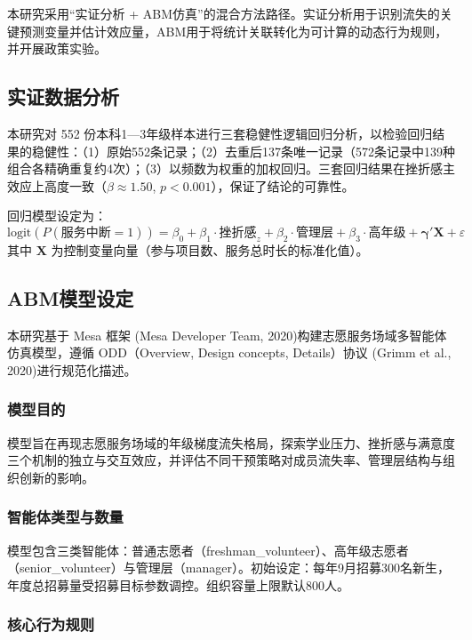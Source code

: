 \documentclass[12pt,a4paper]{article}
\begin{document}
本研究采用“实证分析 + ABM仿真”的混合方法路径。实证分析用于识别流失的关键预测变量并估计效应量，ABM用于将统计关联转化为可计算的动态行为规则，并开展政策实验。

\subsection{实证数据分析}

本研究对 552 份本科1—3年级样本进行三套稳健性逻辑回归分析，以检验回归结果的稳健性：（1）原始552条记录；（2）去重后137条唯一记录（572条记录中139种组合各精确重复约4次）；（3）以频数为权重的加权回归。三套回归结果在挫折感主效应上高度一致（$\beta \approx 1.50$, $p < 0.001$），保证了结论的可靠性。

回归模型设定为：
\begin{equation}
\text{logit}(P(\text{服务中断}=1)) = \beta_0 + \beta_1 \cdot \text{挫折感}_z + \beta_2 \cdot \text{管理层} + \beta_3 \cdot \text{高年级} + \boldsymbol{\gamma}'\mathbf{X} + \varepsilon
\end{equation}
其中 $\mathbf{X}$ 为控制变量向量（参与项目数、服务总时长的标准化值）。

\subsection{ABM模型设定}

本研究基于 Mesa 框架 (Mesa Developer Team, 2020)构建志愿服务场域多智能体仿真模型，遵循 ODD（Overview, Design concepts, Details）协议 (Grimm et al., 2020)进行规范化描述。

\subsubsection{模型目的}

模型旨在再现志愿服务场域的年级梯度流失格局，探索学业压力、挫折感与满意度三个机制的独立与交互效应，并评估不同干预策略对成员流失率、管理层结构与组织创新的影响。

\subsubsection{智能体类型与数量}

模型包含三类智能体：普通志愿者（freshman\_volunteer）、高年级志愿者（senior\_volunteer）与管理层（manager）。初始设定：每年9月招募300名新生，年度总招募量受招募目标参数调控。组织容量上限默认800人。

\subsubsection{核心行为规则}
\end{document}
